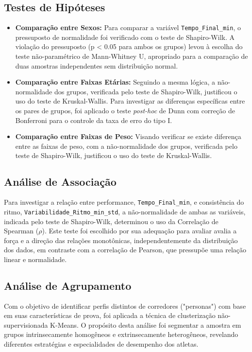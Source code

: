 \subsection{Testes de Hipóteses}
\begin{itemize}
    \item \textbf{Comparação entre Sexos:} Para comparar a variável \texttt{Tempo\_Final\_min}, o pressuposto de normalidade foi verificado com o teste de Shapiro-Wilk. A violação do pressuposto (p < 0.05 para ambos os grupos) levou à escolha do teste não-paramétrico de Mann-Whitney U, apropriado para a comparação de duas amostras independentes sem distribuição normal.
    \item \textbf{Comparação entre Faixas Etárias:} Seguindo a mesma lógica, a não-normalidade dos grupos, verificada pelo teste de Shapiro-Wilk, justificou o uso do teste de Kruskal-Wallis. Para investigar as diferenças específicas entre os pares de grupos, foi aplicado o teste \emph{post-hoc} de Dunn com correção de Bonferroni para o controle da taxa de erro do tipo I.
    \item \textbf{Comparação entre Faixas de Peso:} Visando verificar se existe diferença entre as faixas de peso, com a não-normalidade dos grupos, verificada pelo teste de Shapiro-Wilk, justificou o uso do teste de Kruskal-Wallis.
\end{itemize}

\subsection{Análise de Associação}
Para investigar a relação entre performance, \texttt{Tempo\_Final\_min}, e consistência do ritmo, \texttt{Variabilidade\_Ritmo\_min\_std}, a não-normalidade de ambas as variáveis, indicada pelo teste de Shapiro-Wilk, determinou o uso da Correlação de Spearman ($\rho$). Este teste foi escolhido por sua adequação para avaliar avalia a força e a direção das relações monotônicas, independentemente da distribuição dos dados, em contraste com a correlação de Pearson, que pressupõe uma relação linear e normalidade.

\subsection{Análise de Agrupamento}

Com o objetivo de identificar perfis distintos de corredores ("personas") com base em suas características de prova, foi aplicada a técnica de clusterização não-supervisionada K-Means. O propósito desta análise foi segmentar a amostra em grupos intrinsecamente homogêneos e extrinsecamente heterogêneos, revelando diferentes estratégias e especialidades de desempenho dos atletas.

